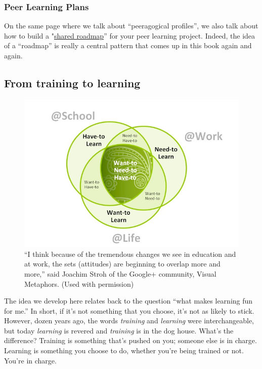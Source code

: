 \subsubsection{Peer Learning Plans}

On the same page where we talk about ``peeragogical profiles'', we also
talk about how to build a
"\href{http://peeragogy.org/patterns-usecases/patterns-and-heuristics/roadmap/}{shared
roadmap}'' for your peer learning project. Indeed, the idea of a
``roadmap'' is really a central pattern that comes up in this book again
and again.

\subsection{From training to learning}

\begin{figure}
\begin{center}
\includegraphics[width=.8\textwidth]{../pictures/learn.jpg}
\caption{``I think because of the tremendous changes we see in education and at
work, the sets (attitudes) are beginning to overlap more and more,''
said Joachim Stroh of the Google+ community, Visual Metaphors. (Used with permission)}
\end{center}
\end{figure}

The idea we develop here relates back to the question ``what makes
learning fun for me.'' In short, if it's not something that you choose,
it's not as likely to stick. However, dozen years ago, the words
\emph{training} and \emph{learning} were interchangeable, but today
\emph{learning} is revered and \emph{training} is in the dog house.
What's the difference? Training is something that's pushed on you;
someone else is in charge. Learning is something you choose to do,
whether you're being trained or not. You're in charge.

